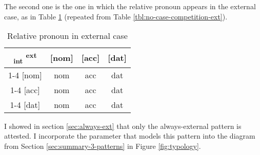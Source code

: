 The second one is the one in which the relative pronoun appears in the external case, as in Table \ref{tbl:no-case-competition-ext-typology} (repeated from Table \ref{tbl:no-case-competition-ext}).

\begin{table}[ht]
  \center
  \caption{Relative pronoun in external case}
  \begin{tabular}{c|c|c|c}
    \toprule
   \textsubscript{\ac{int}} \textsuperscript{\ac{ext}}
          & [\ac{nom}]
          & [\ac{acc}]
          & [\ac{dat}]
          \\ \cmidrule{1-4}
      [\ac{nom}]
          & \ac{nom}
          & \ac{acc}
          & \ac{dat}
          \\ \cmidrule{1-4}
      [\ac{acc}]
          & \ac{nom}
          & \ac{acc}
          & \ac{dat}
          \\ \cmidrule{1-4}
      [\ac{dat}]
          & \ac{nom}
          & \ac{acc}
          & \ac{dat}
          \\
    \bottomrule
  \end{tabular}
  \label{tbl:no-case-competition-ext-typology}
\end{table}

I showed in section \ref{sec:always-ext} that only the always-external pattern is attested.
I incorporate the parameter that models this pattern into the diagram from Section \ref{sec:summary-3-patterns} in Figure \ref{fig:typology}.

